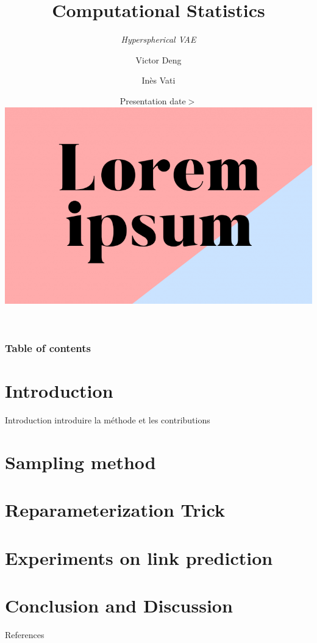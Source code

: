 \documentclass[hyperref={pdftex}]{beamer}
\title{Computational Statistics}
\subtitle{\textit{Hyperspherical VAE}}
\author{Victor Deng \and Inès Vati}
\institute[MVA]{École Normale Supérieure Paris-Saclay, Master MVA}
\date{Presentation date$>$ \\ \vspace{0.3cm} \includegraphics[scale=0.2]{figures/teaser.png}}
\begin{document}
\frame[plain]{\titlepage}

\begin{frame}
   \frametitle{Table of contents}
   \tableofcontents[subsectionstyle=hide]
\end{frame} 

\section{Introduction} 
\begin{frame}{Introduction}
  introduire la méthode et les contributions \cite{davidson_hyperspherical_2022}
  \end{frame}

\section{Sampling method}



\section{Reparameterization Trick}


\section{Experiments on link prediction}



\section{Conclusion and Discussion} 


\begin{frame}{References}
  
\end{frame}
\end{document}
